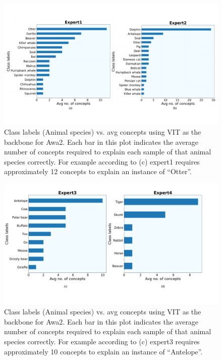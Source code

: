 \begin{figure}
\centering
\includegraphics[width=1\linewidth]
{figures/Supp/Avg_concept_class_VIT_Awa2_1.pdf}
\caption{Class labels (Animal species) vs. avg concepts using VIT as the backbone for Awa2. Each bar in this plot indicates the average number of concepts required to explain each sample of that animal species correctly. For example according to (c) expert1 requires approximately 12 concepts to explain an instance of ``Otter''.}
\label{fig:Awa2_VIT_a}
\end{figure}

\begin{figure}
\centering
\includegraphics[width=1\linewidth]
{figures/Supp/Avg_concept_class_VIT_Awa2_2.pdf}
\caption{Class labels (Animal species) vs. avg concepts using VIT as the backbone for Awa2. Each bar in this plot indicates the average number of concepts required to explain each sample of that animal species correctly. For example according to (c) expert3 requires approximately 10 concepts to explain an instance of ``Antelope''.}
\label{fig:Awa2_VIT_b}
\end{figure}

